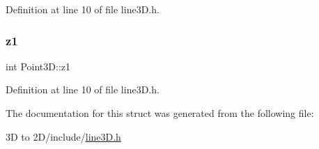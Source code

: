 Definition at line 10 of file line3\+D.\+h.

\mbox{\label{struct_point3_d_aba896f87147261cd12e5706bfb0ccf1f}} 
\subsubsection{\texorpdfstring{z1}{z1}}
{\footnotesize\ttfamily int Point3\+D\+::z1}



Definition at line 10 of file line3\+D.\+h.



The documentation for this struct was generated from the following file\+:\begin{DoxyCompactItemize}
\item 
3\+D to 2\+D/include/\mbox{\hyperlink{line3_d_8h}{line3\+D.\+h}}\end{DoxyCompactItemize}
